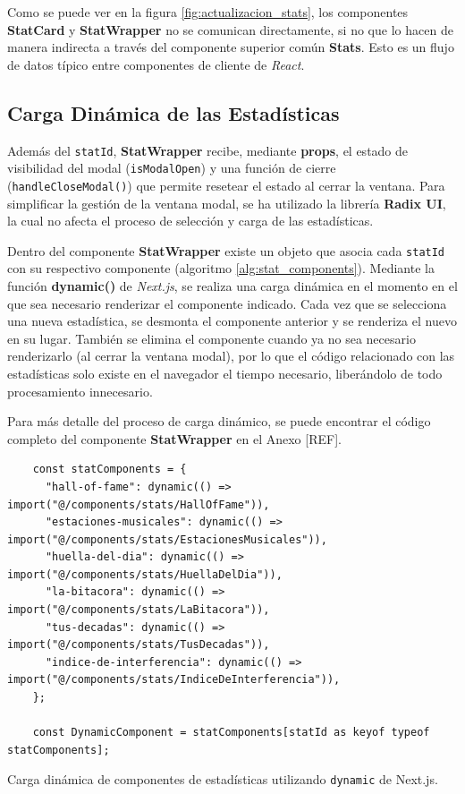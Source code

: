 Como se puede ver en la figura \ref{fig:actualizacion_stats}, los componentes \textbf{StatCard} y \textbf{StatWrapper} no se comunican directamente, si no que lo hacen de manera indirecta a través del componente superior común \textbf{Stats}. Esto es un flujo de datos típico entre componentes de cliente de \textit{React}.

\subsection*{Carga Dinámica de las Estadísticas}

Además del \texttt{statId}, \textbf{StatWrapper} recibe, mediante \textbf{props}, el estado de visibilidad del modal (\texttt{isModalOpen}) y una función de cierre (\texttt{handleCloseModal()}) que permite resetear el estado al cerrar la ventana. Para simplificar la gestión de la ventana modal, se ha utilizado la librería \textbf{Radix UI}, la cual no afecta el proceso de selección y carga de las estadísticas.

Dentro del componente \textbf{StatWrapper} existe un objeto que asocia cada \texttt{statId} con su respectivo componente (algoritmo \ref{alg:stat_components}). Mediante la función \textbf{dynamic()} de \textit{Next.js}, se realiza una carga dinámica en el momento en el que sea necesario renderizar el componente indicado. Cada vez que se selecciona una nueva estadística, se desmonta el componente anterior y se renderiza el nuevo en su lugar. También se elimina el componente cuando ya no sea necesario renderizarlo (al cerrar la ventana modal), por lo que el código relacionado con las estadísticas solo existe en el navegador el tiempo necesario, liberándolo de todo procesamiento innecesario.

Para más detalle del proceso de carga dinámico, se puede encontrar el código completo del componente \textbf{StatWrapper} en el Anexo [REF].

\begin{ifalgorithm}[H]
    \begin{lstlisting}
    const statComponents = {
      "hall-of-fame": dynamic(() => import("@/components/stats/HallOfFame")),
      "estaciones-musicales": dynamic(() => import("@/components/stats/EstacionesMusicales")),
      "huella-del-dia": dynamic(() => import("@/components/stats/HuellaDelDia")),
      "la-bitacora": dynamic(() => import("@/components/stats/LaBitacora")),
      "tus-decadas": dynamic(() => import("@/components/stats/TusDecadas")),
      "indice-de-interferencia": dynamic(() => import("@/components/stats/IndiceDeInterferencia")),
    };

    const DynamicComponent = statComponents[statId as keyof typeof statComponents];
    \end{lstlisting}
    \caption{Carga dinámica de componentes de estadísticas utilizando \texttt{dynamic} de Next.js.}
    \label{alg:stat_components}
\end{ifalgorithm}

